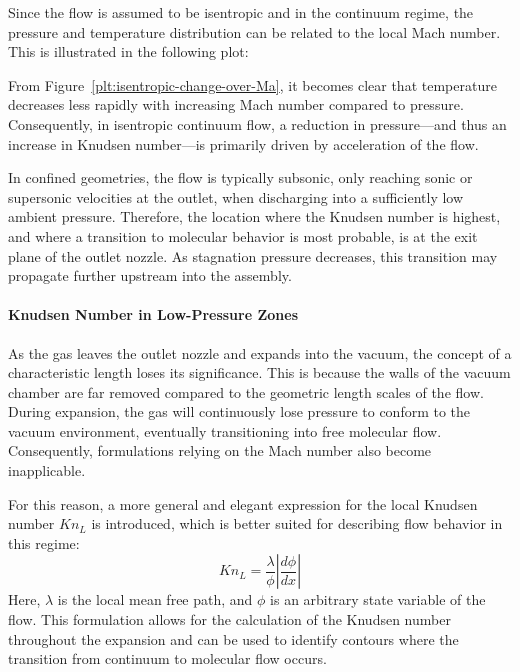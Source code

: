 	Since the flow is assumed to be isentropic and in the continuum regime, the pressure and temperature distribution can be related to the local Mach number.
	This is illustrated in the following plot:

	

	From Figure~\ref{plt:isentropic-change-over-Ma}, it becomes clear that temperature decreases less rapidly with increasing Mach number compared to pressure.
	Consequently, in isentropic continuum flow, a reduction in pressure—and thus an increase in Knudsen number—is primarily driven by acceleration of the flow.

	In confined geometries, the flow is typically subsonic, only reaching sonic or supersonic velocities at the outlet, when discharging into a sufficiently low ambient pressure.
	Therefore, the location where the Knudsen number is highest, and where a transition to molecular behavior is most probable, is at the exit plane of the outlet nozzle.
	As stagnation pressure decreases, this transition may propagate further upstream into the assembly.

	\paragraph{Knudsen Number in Low-Pressure Zones}
		As the gas leaves the outlet nozzle and expands into the vacuum, the concept of a characteristic length loses its significance.
		This is because the walls of the vacuum chamber are far removed compared to the geometric length scales of the flow.
		During expansion, the gas will continuously lose pressure to conform to the vacuum environment, eventually transitioning into free molecular flow.
		Consequently, formulations relying on the Mach number also become inapplicable.

		For this reason, a more general and elegant expression for the local Knudsen number $Kn_L$ is introduced, which is better suited for describing flow behavior in this regime:
		\begin{equation}
			Kn_L = \frac{\lambda}{\phi} \left| \frac{d\phi}{dx} \right|
		\end{equation}
		Here, $\lambda$ is the local mean free path, and $\phi$ is an arbitrary state variable of the flow.
		This formulation allows for the calculation of the Knudsen number throughout the expansion and can be used to identify contours where the transition from continuum to molecular flow occurs.
		\cite{bird_dsmc_2013, Grabe2008, LiLam1964}

